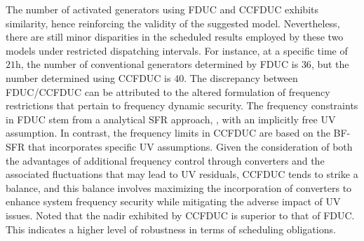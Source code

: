 \documentclass[lettersize,journal]{IEEEtran}
\begin{document}
The number of activated generators using FDUC and CCFDUC exhibits similarity, hence reinforcing the validity of the suggested model. Nevertheless, there are still minor disparities in the scheduled results employed by these two models under restricted dispatching intervals. For instance, at a specific time of $21$h, the number of conventional generators determined by FDUC is $36$, but the number determined using CCFDUC is $40$. The discrepancy between FDUC/CCFDUC can be attributed to the altered formulation of frequency restrictions that pertain to frequency dynamic security. The frequency constraints in FDUC stem from a analytical SFR approach, \cite{paturet2020stochastic,anderson1990low, shi2018analytical}, with an implicitly free UV assumption. In contrast, the frequency limits in CCFDUC are based on the BF-SFR that incorporates specific UV assumptions. Given the consideration of both the advantages of additional frequency control through converters and the associated fluctuations that may lead to UV residuals, CCFDUC tends to strike a balance, and this balance involves maximizing the incorporation of converters to enhance system frequency security while mitigating the adverse impact of UV issues. Noted that the nadir exhibited by CCFDUC is superior to that of FDUC. This indicates a higher level of robustness in terms of scheduling obligations.


\end{document}
